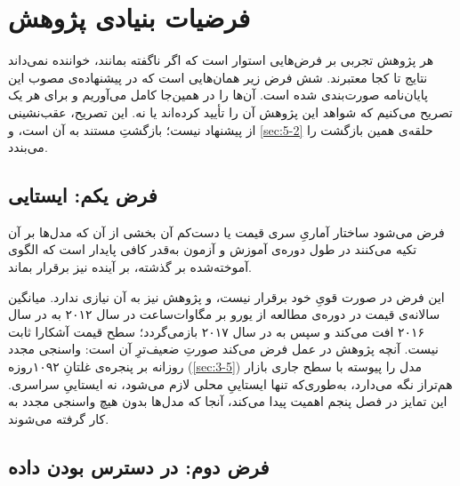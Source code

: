 
\section{فرضیات بنیادی پژوهش}
\label{sec:3-2}

هر پژوهش تجربی بر فرض‌هایی استوار است که اگر ناگفته بمانند، خواننده نمی‌داند نتایج
تا کجا معتبرند. شش فرض زیر همان‌هایی است که در پیشنهاده‌ی مصوب این پایان‌نامه
صورت‌بندی شده است. آن‌ها را در همین‌جا کامل می‌آوریم و برای هر یک تصریح می‌کنیم که
شواهد این پژوهش آن را تأیید کرده‌اند یا نه. این تصریح، عقب‌نشینی از پیشنهاد نیست؛
بازگشتِ مستند به آن است، و \cref{sec:5-2} حلقه‌ی همین بازگشت را می‌بندد.

\subsection*{فرض یکم: ایستایی}

فرض می‌شود ساختار آماریِ سری قیمت  یا دست‌کم آن بخشی از آن که مدل‌ها بر آن
تکیه می‌کنند  در طول دوره‌ی آموزش و آزمون به‌قدر کافی پایدار است که الگوی
آموخته‌شده بر گذشته، بر آینده نیز برقرار بماند.

این فرض در صورت قویِ خود برقرار نیست، و پژوهش نیز به آن نیازی ندارد. میانگین سالانه‌ی
قیمت در دوره‌ی مطالعه از  یورو بر مگاوات‌ساعت در سال ۲۰۱۲ به  در سال ۲۰۱۶
افت می‌کند و سپس به  در سال ۲۰۱۷ بازمی‌گردد؛ سطح قیمت آشکارا ثابت نیست. آنچه
پژوهش در عمل فرض می‌کند صورتِ ضعیف‌ترِ آن است: واسنجی مجدد روزانه بر پنجره‌ی غلتانِ
۱۰۹۲روزه (\cref{sec:3-5}) مدل را پیوسته با سطح جاری بازار هم‌تراز نگه می‌دارد، به‌طوری‌که
تنها ایستاییِ محلی لازم می‌شود، نه ایستاییِ سراسری. این تمایز در فصل پنجم اهمیت پیدا
می‌کند، آنجا که مدل‌ها بدون هیچ واسنجی مجدد به کار گرفته می‌شوند.

\subsection*{فرض دوم: در دسترس بودن داده}

